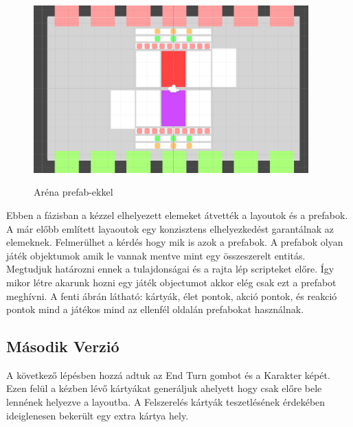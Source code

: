 \begin{figure}[h]
        \centering
        \includegraphics[width=400px,keepaspectratio]{images/Boardconcept.png}
        \label{ArenaLvl2}
        \caption {Aréna prefab-ekkel}
    \hspace{1em}
\end{figure}

Ebben a fázisban a kézzel elhelyezett elemeket átvették a layoutok és a prefabok. A már előbb említett layaoutok egy konzisztens elhelyezkedést garantálnak az elemeknek. Felmerülhet a kérdés hogy mik is azok a prefabok. A prefabok olyan játék objektumok amik le vannak mentve mint egy összeszerelt entitás. Megtudjuk határozni ennek a tulajdonságai és a rajta lép scripteket előre. Így mikor létre akarunk hozni egy játék objectumot akkor elég csak ezt a prefabot meghívni. A fenti ábrán látható: kártyák, élet pontok, akció pontok, és reakció pontok mind a játékos mind az ellenfél oldalán prefabokat használnak.


\clearpage

\subsection{Második Verzió}

A következő lépésben hozzá adtuk az End Turn gombot és a Karakter képét. Ezen felül a kézben lévő kártyákat generáljuk ahelyett hogy csak előre bele lennének helyezve a layoutba. A Felszerelés kártyák teszetlésének érdekében ideiglenesen bekerült egy extra kártya hely.

